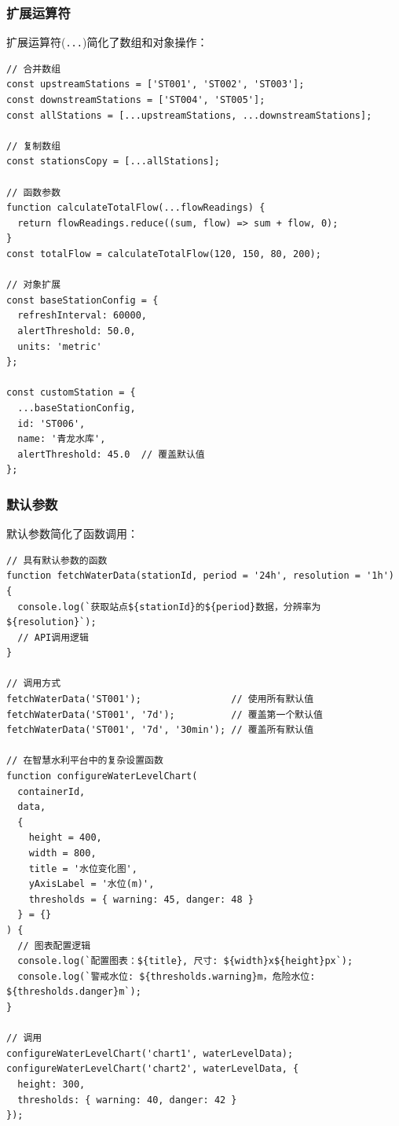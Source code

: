 \subsubsection{扩展运算符}\label{ux6269ux5c55ux8fd0ux7b97ux7b26}

扩展运算符(\passthrough{\lstinline!...!})简化了数组和对象操作：

\begin{lstlisting}
// 合并数组
const upstreamStations = ['ST001', 'ST002', 'ST003'];
const downstreamStations = ['ST004', 'ST005'];
const allStations = [...upstreamStations, ...downstreamStations];

// 复制数组
const stationsCopy = [...allStations];

// 函数参数
function calculateTotalFlow(...flowReadings) {
  return flowReadings.reduce((sum, flow) => sum + flow, 0);
}
const totalFlow = calculateTotalFlow(120, 150, 80, 200);

// 对象扩展
const baseStationConfig = {
  refreshInterval: 60000,
  alertThreshold: 50.0,
  units: 'metric'
};

const customStation = {
  ...baseStationConfig,
  id: 'ST006',
  name: '青龙水库',
  alertThreshold: 45.0  // 覆盖默认值
};
\end{lstlisting}

\subsubsection{默认参数}\label{ux9ed8ux8ba4ux53c2ux6570}

默认参数简化了函数调用：

\begin{lstlisting}
// 具有默认参数的函数
function fetchWaterData(stationId, period = '24h', resolution = '1h') {
  console.log(`获取站点${stationId}的${period}数据，分辨率为${resolution}`);
  // API调用逻辑
}

// 调用方式
fetchWaterData('ST001');                // 使用所有默认值
fetchWaterData('ST001', '7d');          // 覆盖第一个默认值
fetchWaterData('ST001', '7d', '30min'); // 覆盖所有默认值

// 在智慧水利平台中的复杂设置函数
function configureWaterLevelChart(
  containerId, 
  data, 
  {
    height = 400, 
    width = 800, 
    title = '水位变化图', 
    yAxisLabel = '水位(m)',
    thresholds = { warning: 45, danger: 48 }
  } = {}
) {
  // 图表配置逻辑
  console.log(`配置图表：${title}, 尺寸: ${width}x${height}px`);
  console.log(`警戒水位: ${thresholds.warning}m，危险水位: ${thresholds.danger}m`);
}

// 调用
configureWaterLevelChart('chart1', waterLevelData);
configureWaterLevelChart('chart2', waterLevelData, { 
  height: 300, 
  thresholds: { warning: 40, danger: 42 } 
});
\end{lstlisting}

